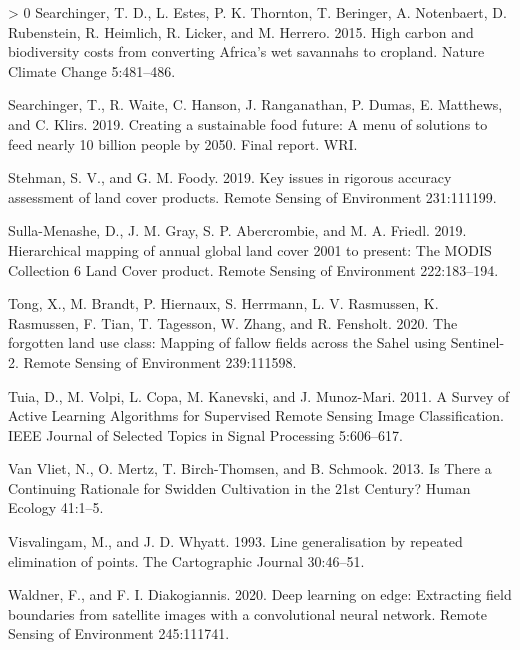 \documentclass[11pt,a4paper]{article}
\newlength{\cslhangindent}
\newenvironment{CSLReferences}[3] %
 {%
  \setlength{\parindent}{0pt}
  \ifodd #1 \everypar{\setlength{\hangindent}{\cslhangindent}}\ignorespaces\fi
  \ifnum #2 > 0
  \setlength{\parskip}{#2\baselineskip}
  \fi
 }%
 {}
\begin{document}
\begin{CSLReferences}{1}{0}
\leavevmode\hypertarget{ref-SearchingerHighcarbonbiodiversity2015}{}%
Searchinger, T. D., L. Estes, P. K. Thornton, T. Beringer, A.
Notenbaert, D. Rubenstein, R. Heimlich, R. Licker, and M. Herrero. 2015.
High carbon and biodiversity costs from converting {Africa}'s wet
savannahs to cropland. Nature Climate Change 5:481--486.

\leavevmode\hypertarget{ref-searchingerCreatingSustainableFood2019}{}%
Searchinger, T., R. Waite, C. Hanson, J. Ranganathan, P. Dumas, E.
Matthews, and C. Klirs. 2019. Creating a sustainable food future: A menu
of solutions to feed nearly 10 billion people by 2050. {Final} report.
{WRI}.

\leavevmode\hypertarget{ref-StehmanKeyissuesrigorous2019}{}%
Stehman, S. V., and G. M. Foody. 2019. Key issues in rigorous accuracy
assessment of land cover products. Remote Sensing of Environment
231:111199.

\leavevmode\hypertarget{ref-sulla-menasheHierarchicalMappingAnnual2019}{}%
Sulla-Menashe, D., J. M. Gray, S. P. Abercrombie, and M. A. Friedl.
2019. Hierarchical mapping of annual global land cover 2001 to present:
The {MODIS Collection} 6 {Land Cover} product. Remote Sensing of
Environment 222:183--194.

\leavevmode\hypertarget{ref-Tongforgottenlanduse2020}{}%
Tong, X., M. Brandt, P. Hiernaux, S. Herrmann, L. V. Rasmussen, K.
Rasmussen, F. Tian, T. Tagesson, W. Zhang, and R. Fensholt. 2020. The
forgotten land use class: Mapping of fallow fields across the {Sahel}
using {Sentinel}-2. Remote Sensing of Environment 239:111598.

\leavevmode\hypertarget{ref-tuiaSurveyActiveLearning2011}{}%
Tuia, D., M. Volpi, L. Copa, M. Kanevski, and J. Munoz-Mari. 2011. A
{Survey} of {Active Learning Algorithms} for {Supervised Remote Sensing
Image Classification}. IEEE Journal of Selected Topics in Signal
Processing 5:606--617.

\leavevmode\hypertarget{ref-vanvlietThereContinuingRationale2013}{}%
Van Vliet, N., O. Mertz, T. Birch-Thomsen, and B. Schmook. 2013. Is
{There} a {Continuing Rationale} for {Swidden Cultivation} in the 21st
{Century}? Human Ecology 41:1--5.

\leavevmode\hypertarget{ref-visvalingamLineGeneralisationRepeated1993}{}%
Visvalingam, M., and J. D. Whyatt. 1993. Line generalisation by repeated
elimination of points. The Cartographic Journal 30:46--51.

\leavevmode\hypertarget{ref-waldnerDeepLearningEdge2020}{}%
Waldner, F., and F. I. Diakogiannis. 2020. Deep learning on edge:
Extracting field boundaries from satellite images with a convolutional
neural network. Remote Sensing of Environment 245:111741.


\end{CSLReferences}
\end{document}
